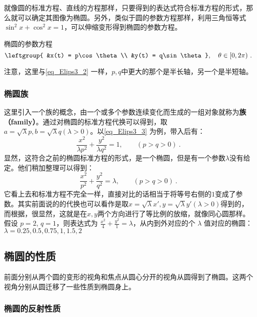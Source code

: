 就像圆的标准方程、直线的方程那样，只要得到的表达式符合标准方程的形式，那么就可以确定其图像为椭圆。另外，类似于圆的参数方程那样，利用三角恒等式$\sin^2x+\cos^2x=1$，可以伸缩变形得到椭圆的参数方程。

\begin{theorem}{椭圆的参数方程}
\begin{equation}\label{eq_Elips3_1}
\leftgroup{
&x(t) = p\cos \theta\\
&y(t) = q\sin \theta
},\quad \theta \in [0, 2\pi) ~.
\end{equation}
\end{theorem}
注意，这里与\autoref{eq_Elips3_2} 一样，$p,q$中更大的那个是半长轴，另一个是半短轴。

\subsubsection{椭圆族}

这里引入一个族的概念，由一个或多个参数连续变化而生成的一组对象就称为\textbf{族（family）}。通过对椭圆的标准方程代换可以得到，取$a=\sqrt{\lambda} p,b=\sqrt{\lambda} q(\lambda>0)$。以\autoref{eq_Elips3_3} 为例，带入后有：
\begin{equation}
\frac{x^2}{\lambda p^2} + \frac{y^2}{\lambda q^2} = 1,\qquad(p>q>0)~.
\end{equation}
显然，这符合之前的椭圆标准方程的形式，是一个椭圆，但是有一个参数$\lambda$没有给定。他们稍加整理可以得到：
\begin{equation}
\frac{x^2}{p^2} + \frac{y^2}{q^2} = \lambda,\qquad(p>q>0)~.
\end{equation}
它看上去和标准方程不完全一样，直接对比的话相当于将等号右侧的$1$变成了参数。其实前面说的的代换也可以看作是取$x=\sqrt{\lambda} x',y=\sqrt{\lambda} y'(\lambda>0)$得到的，而根据，很显然，这就是在$x,y$两个方向进行了等比例的放缩，就像同心圆那样。
假设 $p=2$, $q=1$，则表达式为 $\frac{x^2}{4} + \frac{y^2}{1} = \lambda$，从内到外对应的个 $\lambda$ 值对应的椭圆：
$\lambda = 0.25,0.5,0.75, 1,1.5,2$

\subsection{椭圆的性质}

前面分别从两个圆的变形的视角和焦点从圆心分开的视角从圆得到了椭圆。这两个视角分别从圆迁移了一些性质到椭圆身上。

\subsubsection{椭圆的反射性质}

